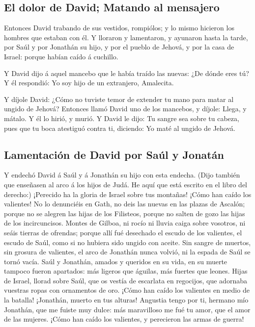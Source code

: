 \hypertarget{el-dolor-de-david-matando-al-mensajero}{%
\subsection{El dolor de David; Matando al
mensajero}\label{el-dolor-de-david-matando-al-mensajero}}

 Entonces David trabando de sus vestidos, rompiólos; y lo
mismo hicieron los hombres que estaban con él.  Y
lloraron y lamentaron, y ayunaron hasta la tarde, por Saúl y por
Jonathán su hijo, y por el pueblo de Jehová, y por la casa de Israel:
porque habían caído á cuchillo.

 Y David dijo á aquel mancebo que le había traído las
nuevas: ¿De dónde eres tú? Y él respondió: Yo soy hijo de un extranjero,
Amalecita.

 Y díjole David: ¿Cómo no tuviste temor de extender tu
mano para matar al ungido de Jehová?  Entonces llamó
David uno de los mancebos, y díjole: Llega, y mátalo. Y él lo hirió, y
murió.  Y David le dijo: Tu sangre sea sobre tu cabeza,
pues que tu boca atestiguó contra ti, diciendo: Yo maté al ungido de
Jehová.

\hypertarget{lamentaciuxf3n-de-david-por-sauxfal-y-jonatuxe1n}{%
\subsection{Lamentación de David por Saúl y
Jonatán}\label{lamentaciuxf3n-de-david-por-sauxfal-y-jonatuxe1n}}

 Y endechó David á Saúl y á Jonathán su hijo con esta
endecha.  (Dijo también que enseñasen al arco á los hijos
de Judá. He aquí que está escrito en el libro del derecho:)
 ¡Perecido ha la gloria de Israel sobre tus montañas!
¡Cómo han caído los valientes!  No lo denunciéis en Gath,
no deis las nuevas en las plazas de Ascalón; porque no se alegren las
hijas de los Filisteos, porque no salten de gozo las hijas de los
incircuncisos.  Montes de Gilboa, ni rocío ni lluvia
caiga sobre vosotros, ni seáis tierras de ofrendas; porque allí fué
desechado el escudo de los valientes, el escudo de Saúl, como si no
hubiera sido ungido con aceite.  Sin sangre de muertos,
sin grosura de valientes, el arco de Jonathán nunca volvió, ni la espada
de Saúl se tornó vacía.  Saúl y Jonathán, amados y
queridos en su vida, en su muerte tampoco fueron apartados: más ligeros
que águilas, más fuertes que leones.  Hijas de Israel,
llorad sobre Saúl, que os vestía de escarlata en regocijos, que adornaba
vuestras ropas con ornamentos de oro.  ¡Cómo han caído
los valientes en medio de la batalla! ¡Jonathán, muerto en tus alturas!
 Angustia tengo por ti, hermano mío Jonathán, que me
fuiste muy dulce: más maravilloso me fué tu amor, que el amor de las
mujeres.  ¡Cómo han caído los valientes, y perecieron las
armas de guerra!

